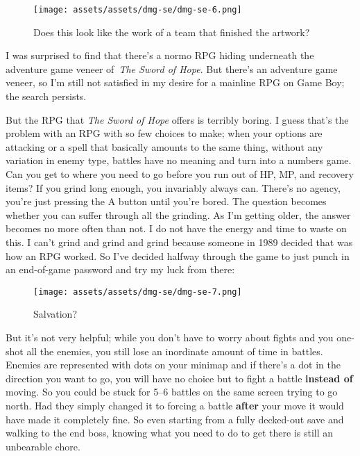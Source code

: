\documentclass{book}
\begin{document}
\begin{figure}[hbt]
\vskip 10pt
\centering \texttt{[image: assets/assets/dmg-se/dmg-se-6.png]}\par\pagetwodescription Does this look like the work of a team that finished the artwork?
\vskip 6pt
\end{figure}
I was surprised to find that there’s a normo RPG hiding underneath the adventure game veneer of~\emph{The Sword of Hope}. But there’s an adventure game veneer, so I’m still not satisfied in my desire for a mainline RPG on Game Boy; the search persists.

But the RPG that \emph{The Sword of Hope} offers is terribly boring. I guess that’s the problem with an RPG with so few choices to make; when your options are attacking or a spell that basically amounts to the same thing, without any variation in enemy type, battles have no meaning and turn into a numbers game. Can you get to where you need to go before you run out of HP, MP, and recovery items? If you grind long enough, you invariably always can. There’s no agency, you’re just pressing the A button until you’re bored. The question becomes whether you can suffer through all the grinding. As I’m getting older, the answer becomes no more often than not. I do not have the energy and time to waste on this. I can’t grind and grind and grind because someone in 1989 decided that was how an RPG worked. So I’ve decided halfway through the game to just punch in an end-of-game password and try my luck from there:

\begin{figure}[hbt]
\vskip 10pt
\centering \texttt{[image: assets/assets/dmg-se/dmg-se-7.png]}\par\pagetwodescription Salvation?
\vskip 6pt
\end{figure}

But it’s not very helpful; while you don’t have to worry about fights and you one-shot all the enemies, you still lose an inordinate amount of time in battles. Enemies are represented with dots on your minimap and if there’s a dot in the direction you want to go, you will have no choice but to fight a battle \textbf{instead of} moving. So you could be stuck for 5–6 battles on the same screen trying to go north. Had they simply changed it to forcing a battle \textbf{after} your move it would have made it completely fine. So even starting from a fully decked-out save and walking to the end boss, knowing what you need to do to get there is still an unbearable chore.
\end{document}
